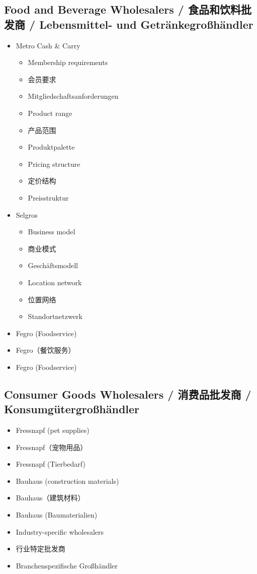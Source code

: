 \subsection{Food and Beverage Wholesalers / 食品和饮料批发商 / Lebensmittel- und Getränkegroßhändler}
\begin{itemize}
    \item Metro Cash \& Carry
    \begin{itemize}
        \item Membership requirements
        \item 会员要求
        \item Mitgliedschaftsanforderungen
        \item Product range
        \item 产品范围
        \item Produktpalette
        \item Pricing structure
        \item 定价结构
        \item Preisstruktur
    \end{itemize}
    \item Selgros
    \begin{itemize}
        \item Business model
        \item 商业模式
        \item Geschäftsmodell
        \item Location network
        \item 位置网络
        \item Standortnetzwerk
    \end{itemize}
    \item Fegro (Foodservice)
    \item Fegro（餐饮服务）
    \item Fegro (Foodservice)
\end{itemize}

\subsection{Consumer Goods Wholesalers / 消费品批发商 / Konsumgütergroßhändler}
\begin{itemize}
    \item Fressnapf (pet supplies)
    \item Fressnapf（宠物用品）
    \item Fressnapf (Tierbedarf)
    \item Bauhaus (construction materials)
    \item Bauhaus（建筑材料）
    \item Bauhaus (Baumaterialien)
    \item Industry-specific wholesalers
    \item 行业特定批发商
    \item Branchenspezifische Großhändler
\end{itemize}

